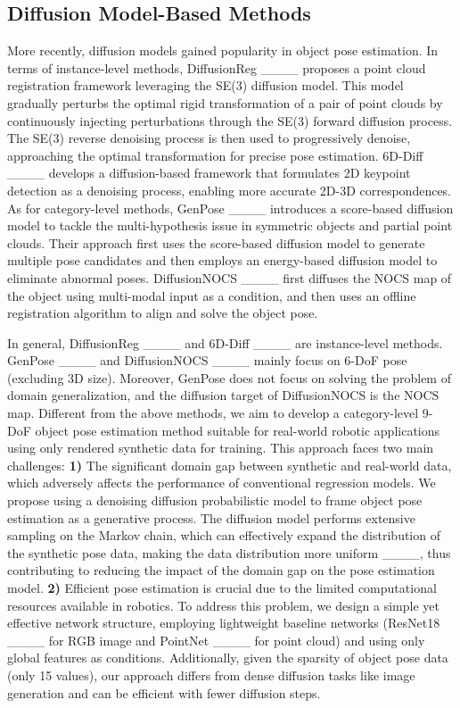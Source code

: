 \vspace{-1em}
\subsection{Diffusion Model-Based Methods}
\par More recently, diffusion models gained popularity in object pose estimation. In terms of instance-level methods, DiffusionReg ____ proposes a point cloud registration framework leveraging the SE(3) diffusion model. This model gradually perturbs the optimal rigid transformation of a pair of point clouds by continuously injecting perturbations through the SE(3) forward diffusion process. The SE(3) reverse denoising process is then used to progressively denoise, approaching the optimal transformation for precise pose estimation. 6D-Diff ____ develops a diffusion-based framework that formulates 2D keypoint detection as a denoising process, enabling more accurate 2D-3D correspondences. As for category-level methods, GenPose ____ introduces a score-based diffusion model to tackle the multi-hypothesis issue in symmetric objects and partial point clouds. Their approach first uses the score-based diffusion model to generate multiple pose candidates and then employs an energy-based diffusion model to eliminate abnormal poses. DiffusionNOCS ____ first diffuses the NOCS map of the object using multi-modal input as a condition, and then uses an offline registration algorithm to align and solve the object pose.

\par In general, DiffusionReg ____ and 6D-Diff ____ are instance-level methods. GenPose ____ and DiffusionNOCS ____ mainly focus on 6-DoF pose (excluding 3D size). Moreover, GenPose does not focus on solving the problem of domain generalization, and the diffusion target of DiffusionNOCS is the NOCS map. Different from the above methods, we aim to develop a category-level 9-DoF object pose estimation method suitable for real-world robotic applications using only rendered synthetic data for training. This approach faces two main challenges: \textbf{1)} The significant domain gap between synthetic and real-world data, which adversely affects the performance of conventional regression models. We propose using a denoising diffusion probabilistic model to frame object pose estimation as a generative process. The diffusion model performs extensive sampling on the Markov chain, which can effectively expand the distribution of the synthetic pose data, making the data distribution more uniform ____, thus contributing to reducing the impact of the domain gap on the pose estimation model. \textbf{2)} Efficient pose estimation is crucial due to the limited computational resources available in robotics. To address this problem, we design a simple yet effective network structure, employing lightweight baseline networks (ResNet18 ____ for RGB image and PointNet ____ for point cloud) and using only global features as conditions. Additionally, given the sparsity of object pose data (only 15 values), our approach differs from dense diffusion tasks like image generation and can be efficient with fewer diffusion steps.

